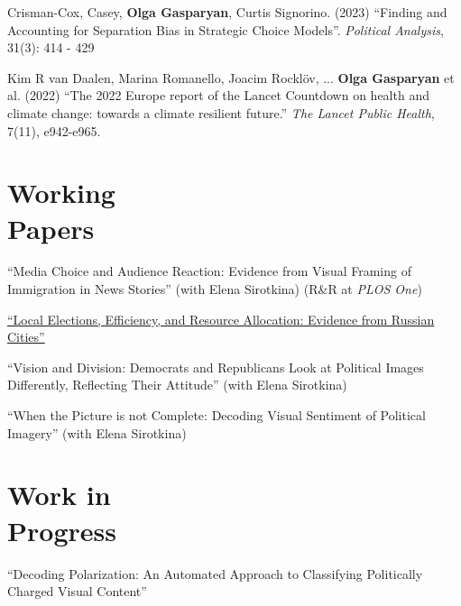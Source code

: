 \documentclass[margin,line,10.95pt]{res}
\begin{document}
\begin{resume}
\vspace*{-2.5mm}

Crisman-Cox, Casey, \textbf{Olga Gasparyan}, Curtis Signorino. (2023) ``Finding and Accounting for Separation Bias in Strategic Choice Models''. \textit{Political Analysis}, 31(3): 414 - 429

\vspace*{-2.5mm}

Kim R van Daalen, Marina Romanello, Joacim Rocklöv, ... \textbf{Olga Gasparyan} et al. (2022) ``The 2022 Europe report of the Lancet Countdown on health and climate change: towards a climate resilient future.'' \textit{The Lancet Public Health}, 7(11), e942-e965.


\section{\sc Working \\ Papers}
``Media Choice and Audience Reaction: Evidence from Visual Framing of Immigration in News Stories'' (with Elena Sirotkina) (R$\&$R at \textit{PLOS One})

\vspace*{-2.5mm}

\href{https://olgasparyan.com/documents/jmp_feb.pdf}{``Local Elections, Efficiency, and Resource Allocation: Evidence from Russian Cities''}

\vspace*{-2.5mm}
``Vision and Division: Democrats and Republicans Look at Political Images Differently, Reflecting Their Attitude'' (with Elena Sirotkina)

\vspace*{-2.5mm}
``When the Picture is not Complete: Decoding Visual Sentiment of Political Imagery'' (with Elena Sirotkina)


\section{\sc Work in \\ Progress}
``Decoding Polarization: An Automated Approach to Classifying Politically Charged Visual
Content''

\vspace*{-2.5mm}


\end{resume}
\end{document}
